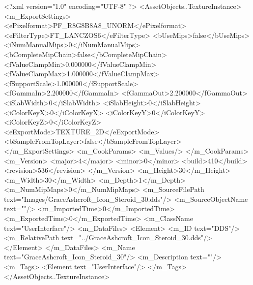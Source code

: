 <?xml version="1.0" encoding="UTF-8" ?>
<AssetObjects..TextureInstance>
	<m_ExportSettings>
		<ePixelformat>PF_R8G8B8A8_UNORM</ePixelformat>
		<eFilterType>FT_LANCZOS6</eFilterType>
		<bUseMips>false</bUseMips>
		<iNumManualMips>0</iNumManualMips>
		<bCompleteMipChain>false</bCompleteMipChain>
		<fValueClampMin>0.000000</fValueClampMin>
		<fValueClampMax>1.000000</fValueClampMax>
		<fSupportScale>1.000000</fSupportScale>
		<fGammaIn>2.200000</fGammaIn>
		<fGammaOut>2.200000</fGammaOut>
		<iSlabWidth>0</iSlabWidth>
		<iSlabHeight>0</iSlabHeight>
		<iColorKeyX>0</iColorKeyX>
		<iColorKeyY>0</iColorKeyY>
		<iColorKeyZ>0</iColorKeyZ>
		<eExportMode>TEXTURE_2D</eExportMode>
		<bSampleFromTopLayer>false</bSampleFromTopLayer>
	</m_ExportSettings>
	<m_CookParams>
		<m_Values/>
	</m_CookParams>
	<m_Version>
		<major>4</major>
		<minor>0</minor>
		<build>410</build>
		<revision>536</revision>
	</m_Version>
	<m_Height>30</m_Height>
	<m_Width>30</m_Width>
	<m_Depth>1</m_Depth>
	<m_NumMipMaps>0</m_NumMipMaps>
	<m_SourceFilePath text="Images/GraceAshcroft_Icon_Steroid_30.dds"/>
	<m_SourceObjectName text=""/>
	<m_ImportedTime>0</m_ImportedTime>
	<m_ExportedTime>0</m_ExportedTime>
	<m_ClassName text="UserInterface"/>
	<m_DataFiles>
		<Element>
			<m_ID text="DDS"/>
			<m_RelativePath text="../GraceAshcroft_Icon_Steroid_30.dds"/>
		</Element>
	</m_DataFiles>
	<m_Name text="GraceAshcroft_Icon_Steroid_30"/>
	<m_Description text=""/>
	<m_Tags>
		<Element text="UserInterface"/>
	</m_Tags>
</AssetObjects..TextureInstance>
